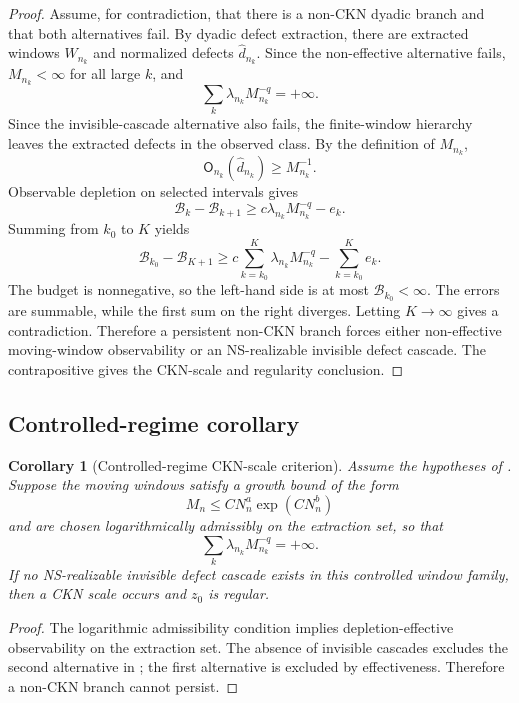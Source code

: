 \documentclass[11pt]{article}
\numberwithin{equation}{section}
\theoremstyle{plain}
\newtheorem{corollary}[theorem]{Corollary}
\theoremstyle{definition}
\theoremstyle{remark}
\begin{document}
\begin{proof}
Assume, for contradiction, that there is a non-CKN dyadic branch and that both
alternatives fail.  By dyadic defect extraction, there are extracted windows
\(W_{n_k}\) and normalized defects \(\widehat d_{n_k}\).  Since the
non-effective alternative fails, \(M_{n_k}<\infty\) for all large \(k\), and
\[
        \sum_k\lambda_{n_k}M_{n_k}^{-q}=+\infty.
\]
Since the invisible-cascade alternative also fails, the finite-window hierarchy
leaves the extracted defects in the observed class.  By the definition of
\(M_{n_k}\),
\[
        \mathsf O_{n_k}(\widehat d_{n_k})\ge M_{n_k}^{-1}.
\]
Observable depletion on selected intervals gives
\[
        \mathscr B_k-\mathscr B_{k+1}
        \ge
        c\lambda_{n_k}M_{n_k}^{-q}-e_k.
\]
Summing from \(k_0\) to \(K\) yields
\[
        \mathscr B_{k_0}-\mathscr B_{K+1}
        \ge
        c\sum_{k=k_0}^{K}\lambda_{n_k}M_{n_k}^{-q}
        -
        \sum_{k=k_0}^{K}e_k.
\]
The budget is nonnegative, so the left-hand side is at most
\(\mathscr B_{k_0}<\infty\).  The errors are summable, while the first sum on
the right diverges.  Letting \(K\to\infty\) gives a contradiction.  Therefore a
persistent non-CKN branch forces either non-effective moving-window
observability or an NS-realizable invisible defect cascade.  The contrapositive
gives the CKN-scale and regularity conclusion.
\end{proof}

\subsection{Controlled-regime corollary}

\begin{corollary}[Controlled-regime CKN-scale criterion]
\label{cor:controlled-regime-ckn-scale}
Assume the hypotheses of .
Suppose the moving windows satisfy a growth bound of the form
\[
        M_n\le C N_n^a\exp(CN_n^b)
\]
and are chosen logarithmically admissibly on the extraction set, so that
\[
        \sum_{k}\lambda_{n_k}M_{n_k}^{-q}=+\infty.
\]
If no NS-realizable invisible defect cascade exists in this controlled window
family, then a CKN scale occurs and \(z_0\) is regular.
\end{corollary}

\begin{proof}
The logarithmic admissibility condition implies depletion-effective
observability on the extraction set.  The absence of invisible cascades excludes
the second alternative in ;
the first alternative is excluded by effectiveness.  Therefore a non-CKN branch
cannot persist.
\end{proof}
\end{document}

